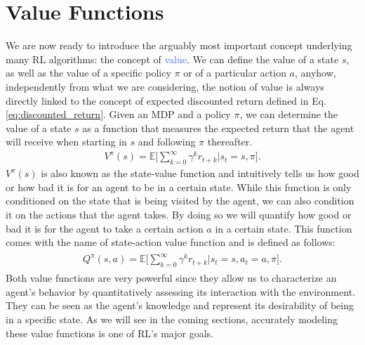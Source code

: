 \section{Value Functions}
\label{sec:value_functions}
We are now ready to introduce the arguably most important concept underlying many RL algorithms: the concept of \textcolor{RoyalBlue}{value}. We can define the value of a state $s$, as well as the value of a specific policy $\pi$ or of a particular action $a$, anyhow, independently from what we are considering, the notion of value is always directly linked to the concept of expected discounted return defined in Eq. \ref{eq:discounted_return}. Given an MDP and a policy $\pi$, we can determine the value of a state $s$ as a function that measures the expected return that the agent will receive when starting in $s$ and following $\pi$ thereafter. 
\begin{align}
    V^{\pi}(s)=\mathds{E}\bigg[\sum_{k=0}^{\infty}\gamma^{k}r_{t+k}\bigg| s_t = s, \pi \bigg].
    \label{eq:state_value_function}
\end{align}
$V^{\pi}(s)$ is also known as the state-value function and intuitively tells us how good or how bad it is for an agent to be in a certain state. While this function is only conditioned on the state that is being visited by the agent, we can also condition it on the actions that the agent takes. By doing so we will quantify how good or bad it is for the agent to take a certain action $a$ in a certain state. This function comes with the name of state-action value function and is defined as follows:
\begin{align}
\begin{split}
     Q^{\pi}(s,a)=\mathds{E}\bigg[\sum_{k=0}^{\infty}\gamma^{k}r_{t+k} \bigg| s_t = s, a_t=a, \pi\bigg].
\end{split}
 \end{align}
Both value functions are very powerful since they allow us to characterize an agent's behavior by quantitatively assessing its interaction with the environment. They can be seen as the agent's knowledge and represent its desirability of being in a specific state. As we will see in the coming sections, accurately modeling these value functions is one of RL's major goals.  

